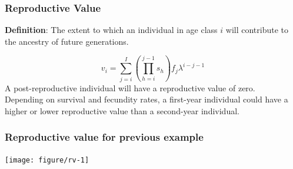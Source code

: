 \documentclass[color=usenames,dvipsnames]{beamer}\usepackage[]{graphicx}\usepackage[]{xcolor}
\begin{document}



\begin{frame}
  \frametitle{Reproductive Value}
  {\bf Definition}: The extent to which an individual in age class
  $i$ will contribute to the ancestry of future generations. \par
  \pause
  \[
    v_i = \sum_{j=i}^{I}\left(\prod_{h=i}^{j-1}s_h\right)f_j\lambda^{i-j-1}
  \]
  \pause
  \vfill
  A post-reproductive individual will have a reproductive value of zero. \\
  \pause
  \vspace{1cm}
  Depending on survival and fecundity rates, a first-year individual
  could have a higher or lower reproductive value than a second-year
  individual. 
\end{frame}









\begin{frame}[fragile]
  \frametitle{Reproductive value for previous example}

\centering
\texttt{[image: figure/rv-1]} \\
\end{frame}
\end{document}
